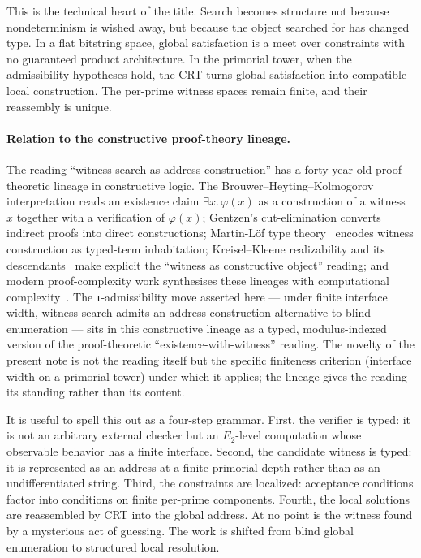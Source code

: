 \documentclass{pantarhei-researchnote}
\newcommand{\Etwo}{\ensuremath{E_2}}
\begin{document}
This is the technical heart of the title. Search becomes structure not
because nondeterminism is wished away, but because the object searched for
has changed type. In a flat bitstring space, global satisfaction is a meet
over constraints with no guaranteed product architecture. In the primorial
tower, when the admissibility hypotheses hold, the CRT turns global
satisfaction into compatible local construction. The per-prime witness
spaces remain finite, and their reassembly is unique.

\paragraph{Relation to the constructive proof-theory lineage.}
The reading ``witness search as address construction'' has a
forty-year-old proof-theoretic lineage in constructive logic. The
Brouwer--Heyting--Kolmogorov interpretation reads an existence claim
$\exists x.\,\varphi(x)$ as a construction of a witness $x$ together
with a verification of $\varphi(x)$; Gentzen's cut-elimination converts
indirect proofs into direct constructions; Martin-L\"of type
theory~\cite{MartinLofTypeTheory} encodes witness construction as
typed-term inhabitation; Kreisel--Kleene realizability and its
descendants~\cite{Troelstra1973Metamathematical} make explicit the
``witness as constructive object'' reading; and modern proof-complexity
work synthesises these lineages with computational
complexity~\cite{KrajicekProofComplexity}. The τ-admissibility move
asserted here — under finite interface width, witness search admits an
address-construction alternative to blind enumeration — sits in this
constructive lineage as a typed, modulus-indexed version of the
proof-theoretic ``existence-with-witness'' reading. The novelty of the
present note is not the reading itself but the specific finiteness
criterion (interface width on a primorial tower) under which it
applies; the lineage gives the reading its standing rather than its
content.

It is useful to spell this out as a four-step grammar. First, the
verifier is typed: it is not an arbitrary external checker but an
\Etwo-level computation whose observable behavior has a finite interface.
Second, the candidate witness is typed: it is represented as an address
at a finite primorial depth rather than as an undifferentiated string.
Third, the constraints are localized: acceptance conditions factor into
conditions on finite per-prime components. Fourth, the local solutions are
reassembled by CRT into the global address. At no point is the witness
found by a mysterious act of guessing. The work is shifted from blind
global enumeration to structured local resolution.
\end{document}
